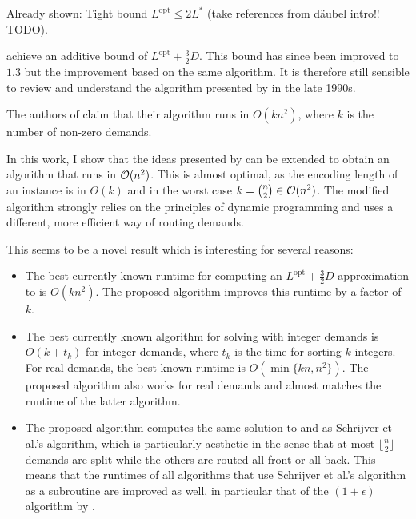 Already shown: Tight bound $L^\mathrm{opt} \leq 2 L^\ast$ (take references from däubel intro!! TODO).

\citet{schrijver99} achieve an additive bound of $L^\mathrm{opt} + \frac{3}{2}D$.
This bound has since been improved to $1.3$ but the improvement based on the same algorithm.
It is therefore still sensible to review and understand the algorithm presented by \citet{schrijver99} in the late 1990s.

The authors of \cite{schrijver99} claim that their algorithm runs in $O(k n^2)$, where $k$ is the number of non-zero demands.

In this work, I show that the ideas presented by \citet{schrijver99} can be extended to obtain an algorithm that runs in $\mathcal{O}(n^2)$.
This is almost optimal, as the encoding length of an instance is in $\Theta(k)$ and in the worst case $k = \binom{n}{2} \in \mathcal{O}(n^2)$.
The modified algorithm strongly relies on the principles of dynamic programming and uses a different, more efficient way of routing demands.


This seems to be a novel result which is interesting for several reasons:
\begin{itemize}
	\item The best currently known runtime for computing an $L^\mathrm{opt} + \frac{3}{2}D$ approximation to \RL is $O(k n^2)$.
	The proposed algorithm improves this runtime by a factor of $k$.
	\item The best currently known algorithm for solving \RRL with integer demands is $O(k + t_k)$ for integer demands, where $t_k$ is the time for sorting $k$ integers.
	For real demands, the best known runtime is $O(\min\{kn, n^2\})$.
	The proposed algorithm also works for real demands and almost matches the runtime of the latter algorithm.
	\item The proposed algorithm computes the same solution to \RL and \RRL as Schrijver et al.'s algorithm, which is particularly aesthetic in the sense that at most $\lfloor\frac{n}{2}\rfloor$ demands are split while the others are routed all front or all back.
	This means that the runtimes of all algorithms that use Schrijver et al.'s algorithm as a subroutine are improved as well, in particular that of the $(1 + \epsilon)$ algorithm by \citet{khanna97}.
\end{itemize}
